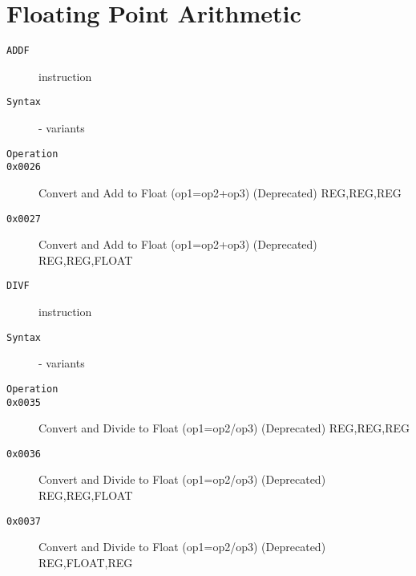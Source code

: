 \section{Floating Point Arithmetic}
\begin{description}
\item[\texttt{ADDF}] instruction\\
\item[\texttt{Syntax}] - variants\\

\item[\texttt{Operation}]
\item[\texttt{}]
\item[\texttt{0x0026}] Convert and Add to Float (op1=op2+op3) (Deprecated)  {REG,REG,REG}       \\
\item[\texttt{0x0027}] Convert and Add to Float (op1=op2+op3) (Deprecated)  {REG,REG,FLOAT}     \\
\end{description}
\clearpage
\begin{description}
\item[\texttt{DIVF}] instruction\\
\item[\texttt{Syntax}] - variants\\

\item[\texttt{Operation}]
\item[\texttt{}]
\item[\texttt{0x0035}] Convert and Divide to Float (op1=op2/op3) (Deprecated)  {REG,REG,REG}       \\
\item[\texttt{0x0036}] Convert and Divide to Float (op1=op2/op3) (Deprecated)  {REG,REG,FLOAT}     \\
\item[\texttt{0x0037}] Convert and Divide to Float (op1=op2/op3) (Deprecated)  {REG,FLOAT,REG}     \\
\end{description}
